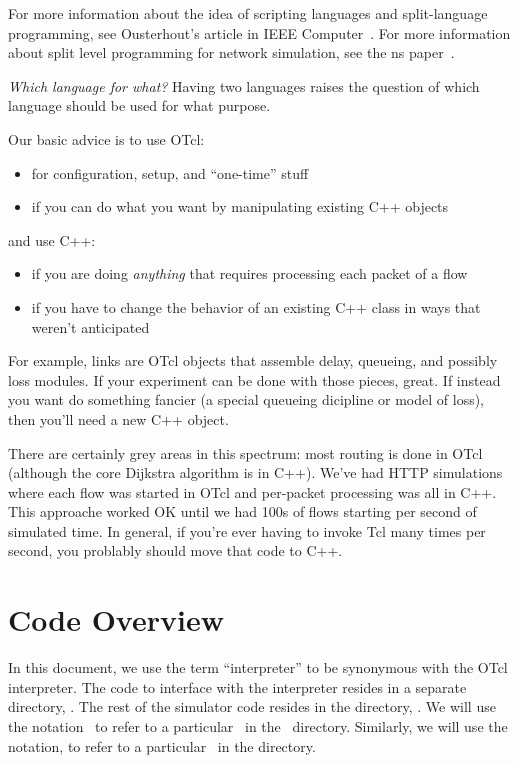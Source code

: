 For more information about the idea of scripting languages
  and split-language programming, see Ousterhout's article
  in IEEE Computer~\cite{Ousterhout98a}.
For more information about split level programming for network simulation,
  see the ns paper~\cite{Bajaj99a}.


\emph{Which language for what?}
Having two languages raises the question of which language should
be used for what purpose.

Our basic advice is to use OTcl:
\begin{itemize}
\item for configuration, setup, and ``one-time'' stuff
\item if you can do what you want by manipulating existing C++ objects
\end{itemize}

and use C++:
\begin{itemize}
\item if you are doing \emph{anything} that requires processing
        each packet of a flow
\item if you have to change the behavior of an existing C++ class
        in ways that weren't anticipated
\end{itemize}

For example, links are OTcl objects that assemble delay, queueing, and
possibly loss modules.  If your experiment can be done with those
pieces, great.  If instead you want do something fancier (a special
queueing dicipline or model of loss), then you'll need a new C++
object.

There are certainly grey areas in this spectrum:
most routing is done in OTcl
(although the core Dijkstra algorithm is in C++).
We've had HTTP simulations where each flow was started in OTcl
  and per-packet processing was all in C++.
This approache worked OK until we had 100s of flows
  starting per second of simulated time.
In general, if you're ever having to invoke Tcl many times per second,
  you problably should move that code to C++.


\section{Code Overview}

In this document,
we use the term ``interpreter''
to be synonymous with the OTcl interpreter.
The code to interface with the interpreter resides
in a separate directory, .
The rest of the simulator code resides in the directory, .
We will use the notation \
to refer to a particular \ in the
\ directory.
Similarly, we will use the notation, 
to refer to a particular \tup{file}\ in the  directory.

